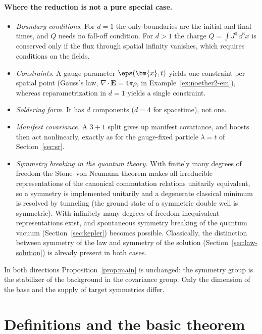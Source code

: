 \paragraph{Where the reduction is not a pure special case.}
\begin{itemize}[leftmargin=1.6em,itemsep=2pt]
\item \emph{Boundary conditions.} For $d=1$ the only boundaries are the initial
  and final times, and $Q$ needs no fall-off condition. For $d>1$ the charge
  $Q=\int J^0\,\dd^3x$ is conserved only if the flux through spatial infinity
  vanishes, which requires conditions on the fields.
\item \emph{Constraints.} A gauge parameter $\eps({\bm{x}},t)$ yields one constraint
  per spatial point (Gauss's law, $\nabla\!\cdot{\bm{E}}=4\pi\rho$, in
  Example~\ref{ex:noether2-em}), whereas reparametrization in $d=1$ yields a
  single constraint.
\item \emph{Soldering form.} It has $d$ components ($d=4$ for spacetime), not one.
\item \emph{Manifest covariance.} A $3{+}1$ split gives up manifest covariance,
  and boosts then act nonlinearly, exactly as for the gauge-fixed particle
  $\lambda=t$ of Section~\ref{sec:sr}.
\item \emph{Symmetry breaking in the quantum theory.} With finitely many
  degrees of freedom the Stone--von Neumann theorem makes all irreducible
  representations of the canonical commutation relations unitarily
  equivalent, so a symmetry is implemented unitarily and a degenerate classical
  minimum is resolved by tunneling (the ground state of a symmetric double well
  is symmetric). With infinitely many degrees of freedom inequivalent
  representations exist, and spontaneous symmetry breaking of the quantum
  vacuum (Section~\ref{sec:kepler}) becomes possible. Classically, the
  distinction between symmetry of the law and symmetry of the solution
  (Section~\ref{sec:law-solution}) is already present in both cases.
\end{itemize}
In both directions Proposition~\ref{prop:main} is unchanged: the symmetry group
is the stabilizer of the background in the covariance group. Only the
dimension of the base and the supply of target symmetries differ.

\section{Definitions and the basic theorem}
\label{sec:definitions}

